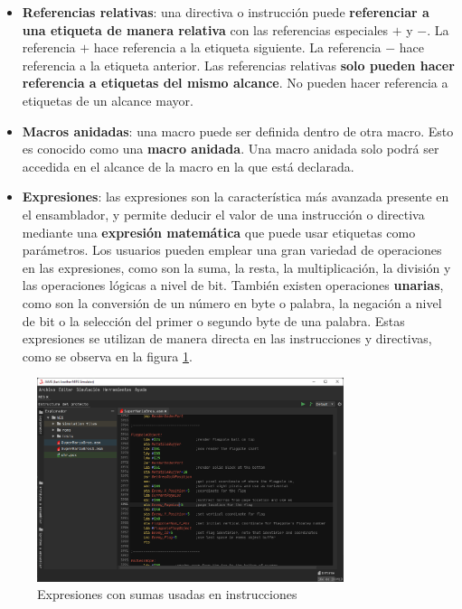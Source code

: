 \begin{itemize}
    \item \textbf{Referencias relativas}: una directiva o instrucción puede \textbf{referenciar a una etiqueta de manera
    relativa} con las referencias especiales $+$ y $-$.
    La referencia $+$ hace referencia a la etiqueta siguiente.
    La referencia $-$ hace referencia a la etiqueta anterior.
    Las referencias relativas \textbf{solo pueden hacer referencia
    a etiquetas del mismo alcance}.
    No pueden hacer referencia a etiquetas de un alcance mayor.
    \item \textbf{Macros anidadas}: una macro puede ser definida dentro de otra macro.
    Esto es conocido como una \textbf{macro anidada}.
    Una macro anidada solo podrá ser accedida en el alcance de la macro
    en la que está declarada.
    \item \textbf{Expresiones}: las expresiones son la característica más avanzada
    presente en el ensamblador, y permite deducir el valor
    de una instrucción o directiva mediante una \textbf{expresión matemática}
    que puede usar etiquetas como parámetros.
    Los usuarios pueden emplear una gran variedad de operaciones
    en las expresiones, como son la suma, la resta, la multiplicación,
    la división y las operaciones lógicas a nivel de bit.
    También existen operaciones \textbf{unarias}, como son
    la conversión de un número en byte o palabra,
    la negación a nivel de bit o la selección del
    primer o segundo byte de una palabra.
    Estas expresiones se utilizan de manera directa en las
    instrucciones y directivas, como se observa en
    la figura \ref{fig:nes-expressions}.
\end{itemize}

\begin{figure}[h]
    \centering
    \includegraphics[width=0.8\textwidth]{images/nes/nes-expressions}
    \caption{Expresiones con sumas usadas en instrucciones}
    \label{fig:nes-expressions}
\end{figure}

